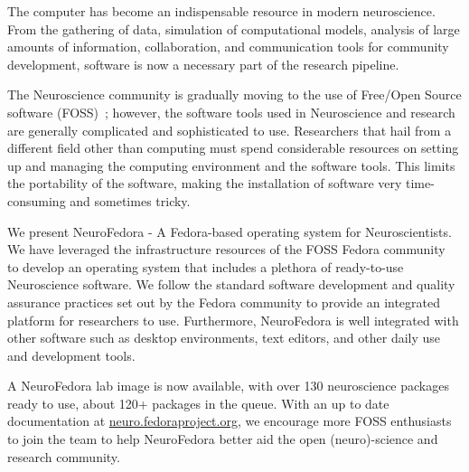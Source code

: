 The computer has become an indispensable resource in modern neuroscience. From the gathering of data, simulation of computational models, analysis of large amounts of information, collaboration, and communication tools for community development, software is now a necessary part of the research pipeline.

The Neuroscience community is gradually moving to the use of Free/Open Source software (FOSS)~\cite{Gleeson2017}; however, the software tools used in Neuroscience and research are generally complicated and sophisticated to use. Researchers that hail from a different field other than computing must spend considerable resources on setting up and managing the computing environment and the software tools. This limits the portability of the software, making the installation of software very time-consuming and sometimes tricky. 

We present NeuroFedora - A Fedora-based operating system for Neuroscientists.
We have leveraged the infrastructure resources of the FOSS Fedora community~\cite{RedHat2008} to develop an operating system that includes a plethora of ready-to-use Neuroscience software.
We follow the standard software development and quality assurance practices set out by the Fedora community to provide an integrated platform for researchers to use.
Furthermore, NeuroFedora is well integrated with other software such as desktop environments, text editors, and other daily use and development tools.

A NeuroFedora lab image is now available, with over 130 neuroscience packages ready to use, about 120+ packages in the queue. With an up to date documentation at \url{neuro.fedoraproject.org}, we encourage more FOSS enthusiasts to join the team to help NeuroFedora better aid the open (neuro)-science and research community.